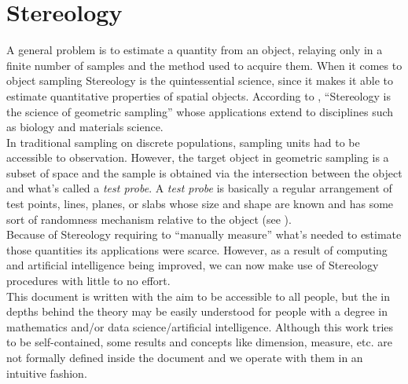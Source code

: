 

\section{Stereology}
A general problem is to estimate a quantity from an object, relaying only in a finite number of samples and the method used to acquire them.
When it comes to object sampling Stereology is the quintessential science, since it makes it able to estimate quantitative properties of spatial objects. According to \cite{CO.IAS.17.Hist.pdf}, ``Stereology is the science of geometric sampling'' whose applications extend to disciplines such as biology and materials science.\\

In traditional sampling on discrete populations, sampling units had to be accessible to observation. However, the target object in geometric sampling is a subset of space and the sample is obtained via the intersection between the object and what's called a \textit{test probe}. A \textit{test probe} is basically a regular arrangement of test points, lines, planes, or slabs whose size and shape are known and has some sort of randomness mechanism relative to the object (see \cite{CO.IAS.17.Hist.pdf}).\\

Because of Stereology requiring to ``manually measure'' what's needed to estimate those quantities its applications were scarce. However, as a result of computing and artificial intelligence being improved, we can now make use of Stereology procedures with little to no effort.\\



This document is written with the aim to be accessible to all people, but the in depths behind the theory may be easily understood for people with a degree in mathematics and/or data science/artificial intelligence. Although this work tries to be self-contained, some results and concepts like dimension, measure, etc. are not formally defined inside the document and we operate with them in an intuitive fashion.\\

